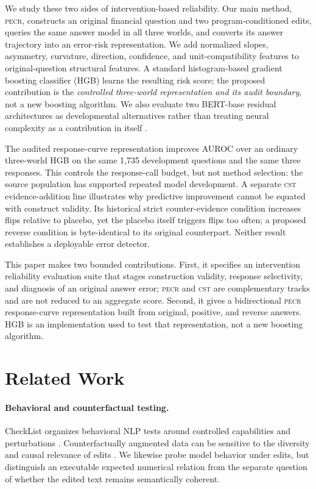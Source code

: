 \documentclass[11pt]{article}
\newcommand{\PECR}{\textsc{pecr}}
\newcommand{\CST}{\textsc{cst}}
\begin{document}
We study these two sides of intervention-based reliability. Our main method, \PECR{}, constructs an original financial question and two program-conditioned edits, queries the same answer model in all three worlds, and converts its answer trajectory into an error-risk representation. We add normalized slopes, asymmetry, curvature, direction, confidence, and unit-compatibility features to original-question structural features. A standard histogram-based gradient boosting classifier (HGB) learns the resulting risk score; the proposed contribution is the \emph{controlled three-world representation and its audit boundary}, not a new boosting algorithm. We also evaluate two BERT-base residual architectures as developmental alternatives rather than treating neural complexity as a contribution in itself \citep{devlin-etal-2019-bert}.

The audited response-curve representation improves AUROC over an ordinary three-world HGB on the same 1,735 development questions and the same three responses. This controls the response-call budget, but not method selection: the source population has supported repeated model development. A separate \CST{} evidence-addition line illustrates why predictive improvement cannot be equated with construct validity. Its historical strict counter-evidence condition increases flips relative to placebo, yet the placebo itself triggers flips too often; a proposed reverse condition is byte-identical to its original counterpart. Neither result establishes a deployable error detector.

This paper makes two bounded contributions. First, it specifies an intervention reliability evaluation suite that stages construction validity, response selectivity, and diagnosis of an original answer error; \PECR{} and \CST{} are complementary tracks and are not reduced to an aggregate score. Second, it gives a bidirectional \PECR{} response-curve representation built from original, positive, and reverse answers. HGB is an implementation used to test that representation, not a new boosting algorithm.

\section{Related Work}
\paragraph{Behavioral and counterfactual testing.}
CheckList organizes behavioral NLP tests around controlled capabilities and perturbations \citep{ribeiro-etal-2020-beyond}. Counterfactually augmented data can be sensitive to the diversity and causal relevance of edits \citep{joshi-he-2022-investigation}. We likewise probe model behavior under edits, but distinguish an executable expected numerical relation from the separate question of whether the edited text remains semantically coherent.
\end{document}
